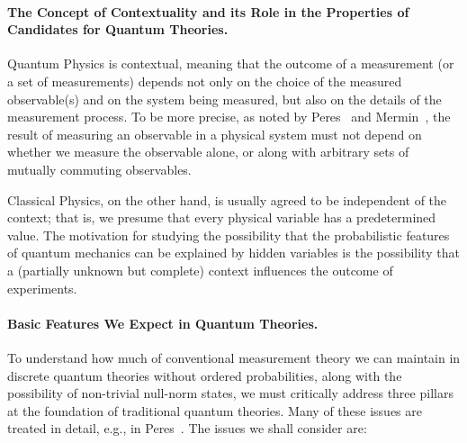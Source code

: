 \documentclass[english,12pt]{iopart}
\begin{document}
\paragraph{The Concept of Contextuality and its Role in the Properties
  of Candidates for Quantum Theories.}
Quantum Physics is contextual, meaning that the outcome of a
measurement (or a set of measurements) depends not only on the choice
of the measured observable(s) and on the system being measured, but
also on the details of the measurement process.  To be more precise,
as noted by Peres~\cite{peres1995quantum} and
Mermin~\cite{MerminPRL1990}, the result of measuring an observable in
a physical system must not depend on whether we measure the observable
alone, or along with arbitrary sets of mutually commuting observables.

Classical Physics, on the other hand, is usually agreed to be
independent of the context; that is, we presume that every physical
variable has a predetermined value.  The motivation for studying the
possibility that the probabilistic features of quantum mechanics can
be explained by hidden variables is the possibility that a (partially
unknown but complete) context influences the outcome of experiments.

\paragraph{Basic Features We Expect in Quantum Theories.}
To understand how much of conventional measurement theory we can
maintain in discrete quantum theories without ordered probabilities,
along with the possibility of non-trivial null-norm states, we must
critically address three pillars at the foundation of traditional
quantum theories. Many of these issues are treated in detail, e.g., in
Peres~\cite{peres1995quantum}.  The issues we shall consider are:
\end{document}
